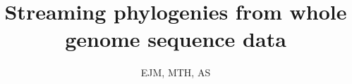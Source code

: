\documentclass[a4paper,10pt]{article}
\title{Streaming phylogenies from whole genome sequence data}
\author{EJM, MTH, AS}
\begin{document}
\maketitle

\begin{abstract}

\end{abstract}
\end{document}

